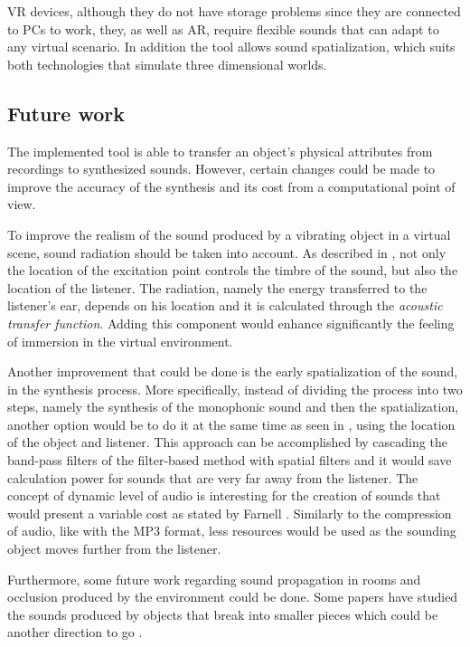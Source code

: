 \gls{VR} devices, although they do not have storage problems since they are connected to PCs to work, they, as well as \gls{AR}, require flexible sounds that can adapt to any virtual scenario. In addition the tool allows sound spatialization, which suits both technologies that simulate three dimensional worlds.

\subsection{Future work}


The implemented tool is able to transfer an object's physical attributes from recordings to synthesized sounds. However, certain changes could be made to improve the accuracy of the synthesis and its cost from a computational point of view.

To improve the realism of the sound produced by a vibrating object in a virtual scene, sound radiation should be taken into account. As described in \cite{corbett2007timbrefields}, not only the location of the excitation point controls the timbre of the sound, but also the location of the listener. The radiation, namely the energy transferred to the listener's ear, depends on his location and it is calculated through the \textit{acoustic transfer function}. Adding this component would enhance significantly the feeling of immersion in the virtual environment.

Another improvement that could be done is the early spatialization of the sound, in the synthesis process. More specifically, instead of dividing the process into two steps, namely the synthesis of the monophonic sound and then the spatialization, another option would be to do it at the same time as seen in \cite{verron2010synthese}, using the location of the object and listener. This approach can be accomplished by cascading the band-pass filters of the filter-based method with spatial filters and it would save calculation power for sounds that are very far away from the listener. The concept of dynamic level of audio is interesting for the creation of sounds that would present a variable cost as stated by Farnell \cite{farnell2010designing}. Similarly to the compression of audio, like with the MP3 format, less resources would be used as the sounding object moves further from the listener. 

Furthermore, some future work regarding sound propagation in rooms and occlusion produced by the environment could be done. Some papers have studied the sounds produced by objects that break into smaller pieces which could be another direction to go \cite{zheng2010rigid}.


